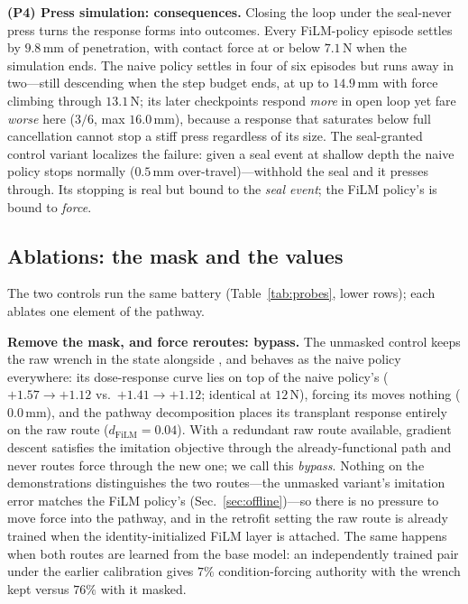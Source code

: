 \textbf{(P4) Press simulation: consequences.} Closing the loop under the seal-never press
turns the response forms into outcomes. Every FiLM-policy episode settles by $9.8$\,mm of
penetration, with contact force at or below $7.1$\,N when the simulation ends. The naive
policy settles in four of six episodes but runs away in two---still descending when the step
budget ends, at up to $14.9$\,mm with force climbing through $13.1$\,N; its later checkpoints
respond \emph{more} in open loop yet fare \emph{worse} here ($3/6$, max $16.0$\,mm), because a
response that saturates below full cancellation cannot stop a stiff press regardless of its
size. The seal-granted control variant localizes the failure: given a seal event at shallow
depth the naive policy stops normally ($0.5$\,mm over-travel)---withhold the seal and it
presses through. Its stopping is real but bound to the \emph{seal event}; the FiLM
policy's is bound to \emph{force}.

\subsection{Ablations: the mask and the \chat{} values}
\label{sec:offline-quintuple}

The two controls run the same battery (Table~\ref{tab:probes}, lower rows); each ablates one
element of the pathway.

\textbf{Remove the mask, and force reroutes: bypass.} The unmasked control keeps the raw
wrench in the state alongside \chat{}, and behaves as the naive policy everywhere: its
dose-response curve lies on top of the naive policy's ($+1.57\rightarrow+1.12$ vs.\
$+1.41\rightarrow+1.12$; identical at $12$\,N), forcing its \chat{} moves nothing ($0.0$\,mm),
and the pathway decomposition places its transplant response entirely on the raw route
($d_{\mathrm{FiLM}}{=}0.04$). With a redundant raw route available, gradient descent satisfies
the imitation objective through the already-functional path and never routes force through the
new one; we call this \emph{bypass}. Nothing on the demonstrations distinguishes the two
routes---the unmasked variant's imitation error matches the FiLM policy's
(Sec.~\ref{sec:offline})---so there is no pressure to move force into the pathway, and in the
retrofit setting the raw route is already trained when the identity-initialized FiLM layer is
attached. The same happens when both routes are learned from the base model: an independently
trained pair under the earlier calibration gives $7\%$ condition-forcing authority with the
wrench kept versus $76\%$ with it masked.

